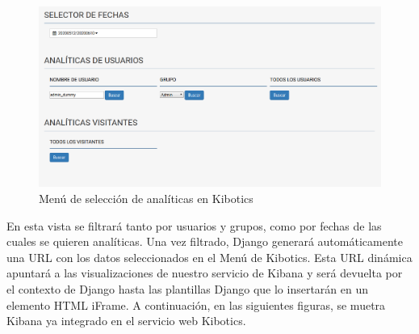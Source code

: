\documentclass[11pt,a4paper]{book}
\begin{document}
				\begin{figure}[H]
					\centering
					\includegraphics[width=14cm, keepaspectratio]{img/kibotics_analytics_menu.png}
					\caption{Menú de selección de analíticas en Kibotics}
					\label{fig:kibotics_analytics_menu}
				\end{figure}
			
				En esta vista se filtrará tanto por usuarios y grupos, como por fechas de las cuales se quieren analíticas. Una vez filtrado, Django generará automáticamente una URL con los datos seleccionados en el Menú de Kibotics. Esta URL dinámica apuntará a las visualizaciones de nuestro servicio de Kibana y será devuelta por el contexto de Django hasta las plantillas Django que lo insertarán en un elemento HTML iFrame. A continuación, en las siguientes figuras, se muetra Kibana ya integrado en el servicio web Kibotics.
					
\end{document}
